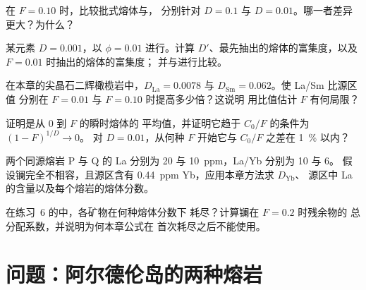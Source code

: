 \begin{exercise}[$\star\star$]\label{exo:b3:trace-element-modelling:7}
在 $F = 0.10$ 时，比较批式熔体与，
分别针对 $D = 0.1$ 与 $D = 0.01$。哪一者差异更大？为什么？
\end{exercise}

\begin{exercise}[$\star\star$]\label{exo:b3:trace-element-modelling:8}
某元素 $D = 0.001$，以 $\phi = 0.01$ 进行。计算
$D'$、最先抽出的熔体的富集度，以及 $F = 0.01$ 时抽出的熔体的富集度；
并与进行比较。
\end{exercise}

\begin{exercise}[$\star\star$]\label{exo:b3:trace-element-modelling:9}
在本章的尖晶石二辉橄榄岩中，$D_{\mathrm{La}} = 0.0078$ 与
$D_{\mathrm{Sm}} = 0.062$。使 La/Sm 比源区值
分别在 $F = 0.01$ 与 $F = 0.10$ 时提高多少倍？这说明
用比值估计 $F$ 有何局限？
\end{exercise}

\begin{exercise}[$\star\star\star$]\label{exo:b3:trace-element-modelling:10}
证明是从 0 到 $F$ 的瞬时熔体的
平均值，并证明它趋于 $C_0/F$ 的条件为 $(1 - F)^{1/D} \to 0$。
对 $D = 0.01$，从何种 $F$ 开始它与 $C_0/F$ 之差在 \qty{1}{\percent} 以内？
\end{exercise}

\begin{exercise}[$\star\star\star$]\label{exo:b3:trace-element-modelling:11}
两个同源熔岩 P 与 Q 的 La 分别为 20 与 \qty{10}{ppm}，La/Yb 分别为 10 与 6。
假设镧完全不相容，且源区含有
\qty{0.44}{ppm} Yb，应用本章方法求 $D_{\mathrm{Yb}}$、
源区中 La 的含量以及每个熔岩的熔体分数。
\end{exercise}

\begin{exercise}[$\star\star\star$]\label{exo:b3:trace-element-modelling:12}
在练习~6 的中，各矿物在何种熔体分数下
耗尽？计算镧在 $F = 0.2$ 时残余物的
总分配系数，并说明为何本章公式在
首次耗尽之后不能使用。
\end{exercise}

\section{问题：阿尔德伦岛的两种熔岩}

